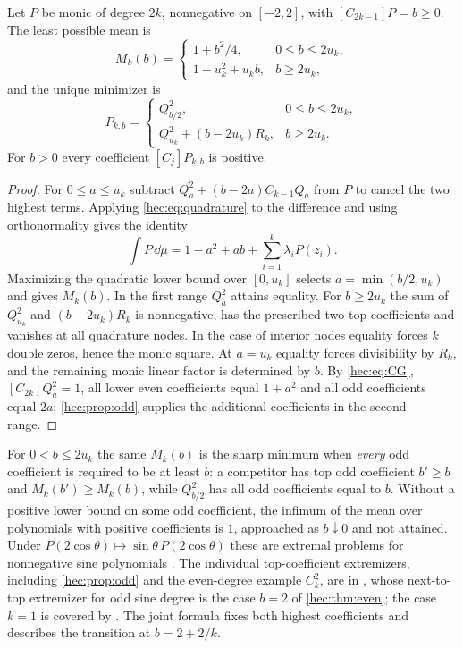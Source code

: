 \begin{theorem}\label{hec:thm:even}
Let $P$ be monic of degree $2k$, nonnegative on $[-2,2]$, with $[C_{2k-1}]P=b\ge0$. The least possible mean
is
\[
 M_k(b)=\begin{cases}1+b^2/4,&0\le b\le2u_k,\\ 1-u_k^2+u_kb,&b\ge2u_k,\end{cases}
\]
and the unique minimizer is
\[
 P_{k,b}=\begin{cases}Q_{b/2}^2,&0\le b\le2u_k,\\ Q_{u_k}^2+(b-2u_k)R_k,&b\ge2u_k .\end{cases}
\]
For $b>0$ every coefficient $[C_j]P_{k,b}$ is positive.
\end{theorem}

\begin{proof}
For $0\le a\le u_k$ subtract $Q_a^2+(b-2a)C_{k-1}Q_a$ from $P$ to cancel the two highest terms. Applying
\eqref{hec:eq:quadrature} to the difference and using orthonormality gives the identity
\[
 \int P\,\dd\mu=1-a^2+ab+\sum_{i=1}^k\lambda_iP(z_i).
\]
Maximizing the quadratic lower bound over $[0,u_k]$ selects $a=\min(b/2,u_k)$ and gives $M_k(b)$. In the
first range $Q_a^2$ attains equality. For $b\ge2u_k$ the sum of $Q_{u_k}^2$ and $(b-2u_k)R_k$ is
nonnegative, has the prescribed two top coefficients and vanishes at all quadrature nodes. In the case of
interior nodes equality forces $k$ double zeros, hence the monic square. At $a=u_k$ equality forces
divisibility by $R_k$, and the remaining monic linear factor is determined by $b$. By \eqref{hec:eq:CG},
$[C_{2k}]Q_a^2=1$, all lower even coefficients equal $1+a^2$ and all odd coefficients equal $2a$;
\cref{hec:prop:odd} supplies the additional coefficients in the second range.
\end{proof}

For $0<b\le2u_k$ the same $M_k(b)$ is the sharp minimum when \emph{every} odd coefficient is required to be
at least $b$: a competitor has top odd coefficient $b'\ge b$ and $M_k(b')\ge M_k(b)$, while $Q_{b/2}^2$ has
all odd coefficients equal to $b$. Without a positive lower bound on some odd coefficient, the infimum of
the mean over polynomials with positive coefficients is $1$, approached as $b\downarrow0$ and not attained.
Under $P(2\cos\theta)\mapsto\sin\theta\,P(2\cos\theta)$ these are extremal problems for nonnegative sine
polynomials \cite{RogosinskiSzego1950Extremum}. The individual top-coefficient extremizers, including
\cref{hec:prop:odd} and the even-degree example $C_k^2$, are in \cite{DimitrovMerlo2002Nonnegative}, whose
next-to-top extremizer for odd sine degree is the case $b=2$ of \cref{hec:thm:even}; the case $k=1$ is
covered by \cite{RoysterSuffridge1970Typically}. The joint formula fixes both highest coefficients and
describes the transition at $b=2+2/k$.


